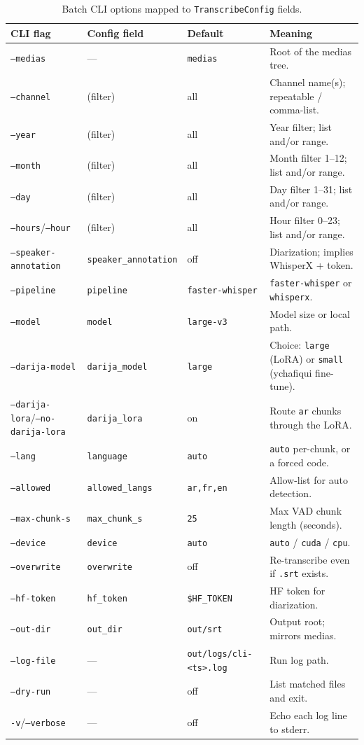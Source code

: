 \documentclass[11pt,a4paper]{report}
\newcommand{\code}[1]{\texttt{\small #1}}
\begin{document}
\begin{table}[ht]
\centering
\small
\renewcommand{\arraystretch}{1.25}
\begin{tabularx}{\textwidth}{@{}l l l X@{}}
\toprule
\textbf{CLI flag} & \textbf{Config field} & \textbf{Default} & \textbf{Meaning}\\
\midrule
\code{--medias} & --- & \code{medias} & Root of the medias tree.\\
\code{--channel} & (filter) & all & Channel name(s); repeatable / comma-list.\\
\code{--year} & (filter) & all & Year filter; list and/or range.\\
\code{--month} & (filter) & all & Month filter 1--12; list and/or range.\\
\code{--day} & (filter) & all & Day filter 1--31; list and/or range.\\
\code{--hours}/\code{--hour} & (filter) & all & Hour filter 0--23; list and/or range.\\
\code{--speaker-annotation} & \code{speaker\_annotation} & off & Diarization; implies WhisperX + token.\\
\code{--pipeline} & \code{pipeline} & \code{faster-whisper} & \code{faster-whisper} or \code{whisperx}.\\
\code{--model} & \code{model} & \code{large-v3} & Model size or local path.\\
\code{--darija-model} & \code{darija\_model} & \code{large} & Choice: \code{large} (LoRA) or \code{small} (ychafiqui fine-tune).\\
\code{--darija-lora}/\code{--no-darija-lora} & \code{darija\_lora} & on & Route \code{ar} chunks through the LoRA.\\
\code{--lang} & \code{language} & \code{auto} & \code{auto} per-chunk, or a forced code.\\
\code{--allowed} & \code{allowed\_langs} & \code{ar,fr,en} & Allow-list for auto detection.\\
\code{--max-chunk-s} & \code{max\_chunk\_s} & \code{25} & Max VAD chunk length (seconds).\\
\code{--device} & \code{device} & \code{auto} & \code{auto} / \code{cuda} / \code{cpu}.\\
\code{--overwrite} & \code{overwrite} & off & Re-transcribe even if \code{.srt} exists.\\
\code{--hf-token} & \code{hf\_token} & \code{\$HF\_TOKEN} & HF token for diarization.\\
\code{--out-dir} & \code{out\_dir} & \code{out/srt} & Output root; mirrors medias.\\
\code{--log-file} & --- & \code{out/logs/cli-<ts>.log} & Run log path.\\
\code{--dry-run} & --- & off & List matched files and exit.\\
\code{-v}/\code{--verbose} & --- & off & Echo each log line to stderr.\\
\bottomrule
\end{tabularx}
\caption{Batch CLI options mapped to \texttt{TranscribeConfig} fields.}
\label{tab:config}
\end{table}
\end{document}

